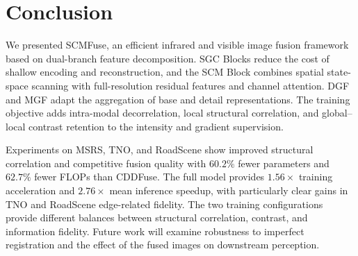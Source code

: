 \FloatBarrier
\section{Conclusion}\label{sec:conclusion}
We presented SCMFuse, an efficient infrared and visible image fusion framework based on dual-branch feature decomposition. SGC Blocks reduce the cost of shallow encoding and reconstruction, and the SCM Block combines spatial state-space scanning with full-resolution residual features and channel attention. DGF and MGF adapt the aggregation of base and detail representations. The training objective adds intra-modal decorrelation, local structural correlation, and global--local contrast retention to the intensity and gradient supervision.

Experiments on MSRS, TNO, and RoadScene show improved structural correlation and competitive fusion quality with $60.2\%$ fewer parameters and $62.7\%$ fewer FLOPs than CDDFuse. The full model provides $1.56\times$ training acceleration and $2.76\times$ mean inference speedup, with particularly clear gains in TNO and RoadScene edge-related fidelity. The two training configurations provide different balances between structural correlation, contrast, and information fidelity. Future work will examine robustness to imperfect registration and the effect of the fused images on downstream perception.
